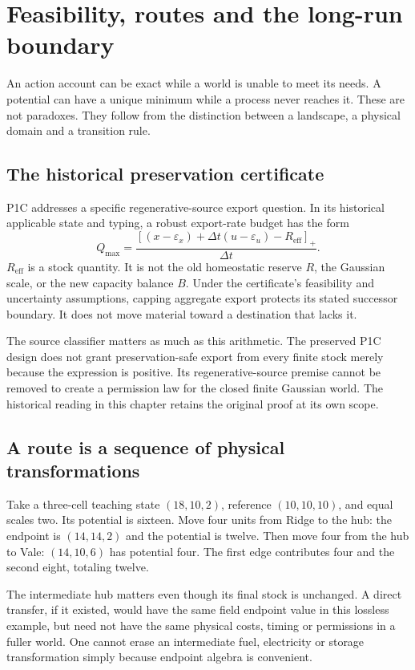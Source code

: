 \chapter{Feasibility, routes and the long-run boundary}\label{ch:longrun}
An action account can be exact while a world is unable to meet its needs.
A potential can have a unique minimum while a process never reaches it.
These are not paradoxes. They follow from the distinction between a
landscape, a physical domain and a transition rule.

\section{The historical preservation certificate}
P1C addresses a specific regenerative-source export question. In its
historical applicable state and typing, a robust export-rate budget has the
form
\begin{equation}
 Q_{\max}=\frac{[(x-\varepsilon_x)+\Delta t(u-\varepsilon_u)
                      -R_{\mathrm{eff}}]_+}{\Delta t}.
\end{equation}
$R_{\mathrm{eff}}$ is a stock quantity. It is not the old homeostatic
reserve $R$, the Gaussian scale, or the new capacity balance $B$. Under
the certificate's feasibility and uncertainty assumptions, capping aggregate
export protects its stated successor boundary. It does not move material
toward a destination that lacks it.

The source classifier matters as much as this arithmetic. The preserved
P1C design does not grant preservation-safe export from every finite stock
merely because the expression is positive. Its regenerative-source premise
cannot be removed to create a permission law for the closed finite Gaussian
world. The historical reading in this chapter retains the original proof at its own scope.

\section{A route is a sequence of physical transformations}
Take a three-cell teaching state $(18,10,2)$, reference $(10,10,10)$,
and equal scales two. Its potential is sixteen. Move four units from
Ridge to the hub: the endpoint is $(14,14,2)$ and the potential is twelve.
Then move four from the hub to Vale: $(14,10,6)$ has potential four.
The first edge contributes four and the second eight, totaling twelve.

The intermediate hub matters even though its final stock is unchanged.
A direct transfer, if it existed, would have the same field endpoint value
in this lossless example, but need not have the same physical costs, timing
or permissions in a fuller world. One cannot erase an intermediate fuel,
electricity or storage transformation simply because endpoint algebra is
convenient.

